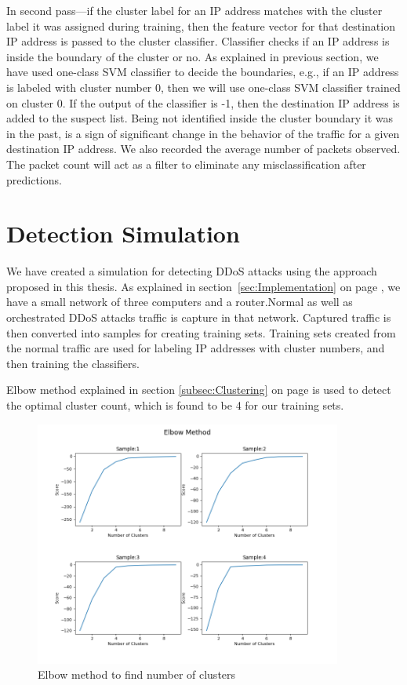 \documentclass[12pt,oneside,a4paper]{article}
\begin{document}
In second pass---if the cluster label for an IP address matches with the cluster label it was assigned during training, then the feature vector for that destination IP address is passed to the cluster classifier. Classifier checks if an IP address is inside the boundary of the cluster or no. As explained in previous section, we have used one-class SVM classifier to decide the boundaries, e.g., if an IP address is labeled with cluster number 0, then we will use one-class SVM classifier trained on cluster 0. If the output of the classifier is -1, then the destination IP address is added to the suspect list. Being not identified inside the cluster boundary it was in the past, is a sign of significant change in the behavior of the traffic for a given destination IP address. We also recorded the average number of packets observed. The packet count will act as a filter to eliminate any misclassification after predictions.
\pagebreak
\section{Detection Simulation}

We have created a simulation for detecting DDoS attacks using the approach proposed in this thesis. As explained in section~\ref{sec:Implementation} on page \pageref{sec:Implementation}, we have a small network of three computers and a router.Normal as well as orchestrated DDoS attacks traffic is capture in that network. Captured traffic is then converted into samples for creating training sets. Training sets created from the normal traffic are used for labeling IP addresses with cluster numbers, and then training the classifiers.

Elbow method explained in section \ref{subsec:Clustering} on page \pageref{subsec:Clustering} is used to detect the optimal cluster count, which is found to be 4 for our training sets.

\begin{figure}[H]
\centering
\includegraphics[width=0.90\textwidth]{elbow-method-applied.png}
\caption{Elbow method to find number of clusters}
\label{fig:elbow-method-applied}
\end{figure}
\end{document}
